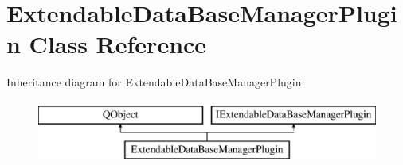 \hypertarget{class_extendable_data_base_manager_plugin}{}\section{Extendable\+Data\+Base\+Manager\+Plugin Class Reference}
\label{class_extendable_data_base_manager_plugin}
Inheritance diagram for Extendable\+Data\+Base\+Manager\+Plugin\+:\begin{figure}[H]
\begin{center}
\leavevmode
\includegraphics[height=2.000000cm]{class_extendable_data_base_manager_plugin}
\end{center}
\end{figure}

